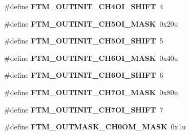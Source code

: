\begin{DoxyCompactItemize}
\item 
\#define {\bfseries F\+T\+M\+\_\+\+O\+U\+T\+I\+N\+I\+T\+\_\+\+C\+H4\+O\+I\+\_\+\+S\+H\+I\+FT}~4\hypertarget{group__FTM__Register__Masks_gac61997ec656e9289b6b9b4a6df30b548}{}\label{group__FTM__Register__Masks_gac61997ec656e9289b6b9b4a6df30b548}

\item 
\#define {\bfseries F\+T\+M\+\_\+\+O\+U\+T\+I\+N\+I\+T\+\_\+\+C\+H5\+O\+I\+\_\+\+M\+A\+SK}~0x20u\hypertarget{group__FTM__Register__Masks_gaa0956e031b19115b7f91bf0138ef8dfe}{}\label{group__FTM__Register__Masks_gaa0956e031b19115b7f91bf0138ef8dfe}

\item 
\#define {\bfseries F\+T\+M\+\_\+\+O\+U\+T\+I\+N\+I\+T\+\_\+\+C\+H5\+O\+I\+\_\+\+S\+H\+I\+FT}~5\hypertarget{group__FTM__Register__Masks_ga7a284efce0663f9bde85b1efc1b1cfd3}{}\label{group__FTM__Register__Masks_ga7a284efce0663f9bde85b1efc1b1cfd3}

\item 
\#define {\bfseries F\+T\+M\+\_\+\+O\+U\+T\+I\+N\+I\+T\+\_\+\+C\+H6\+O\+I\+\_\+\+M\+A\+SK}~0x40u\hypertarget{group__FTM__Register__Masks_ga4140f95c3774bb113eba65b099673d64}{}\label{group__FTM__Register__Masks_ga4140f95c3774bb113eba65b099673d64}

\item 
\#define {\bfseries F\+T\+M\+\_\+\+O\+U\+T\+I\+N\+I\+T\+\_\+\+C\+H6\+O\+I\+\_\+\+S\+H\+I\+FT}~6\hypertarget{group__FTM__Register__Masks_gae1269df4b4b0084a0e722e688c98abe0}{}\label{group__FTM__Register__Masks_gae1269df4b4b0084a0e722e688c98abe0}

\item 
\#define {\bfseries F\+T\+M\+\_\+\+O\+U\+T\+I\+N\+I\+T\+\_\+\+C\+H7\+O\+I\+\_\+\+M\+A\+SK}~0x80u\hypertarget{group__FTM__Register__Masks_ga04c56da93774326348a87fb79211e421}{}\label{group__FTM__Register__Masks_ga04c56da93774326348a87fb79211e421}

\item 
\#define {\bfseries F\+T\+M\+\_\+\+O\+U\+T\+I\+N\+I\+T\+\_\+\+C\+H7\+O\+I\+\_\+\+S\+H\+I\+FT}~7\hypertarget{group__FTM__Register__Masks_ga717e3d932a491d96e6d729ff87e7c0dd}{}\label{group__FTM__Register__Masks_ga717e3d932a491d96e6d729ff87e7c0dd}

\item 
\#define {\bfseries F\+T\+M\+\_\+\+O\+U\+T\+M\+A\+S\+K\+\_\+\+C\+H0\+O\+M\+\_\+\+M\+A\+SK}~0x1u\hypertarget{group__FTM__Register__Masks_gae1ed080952e4ddf3947066d5d97b7920}{}\label{group__FTM__Register__Masks_gae1ed080952e4ddf3947066d5d97b7920}


\end{DoxyCompactItemize}
